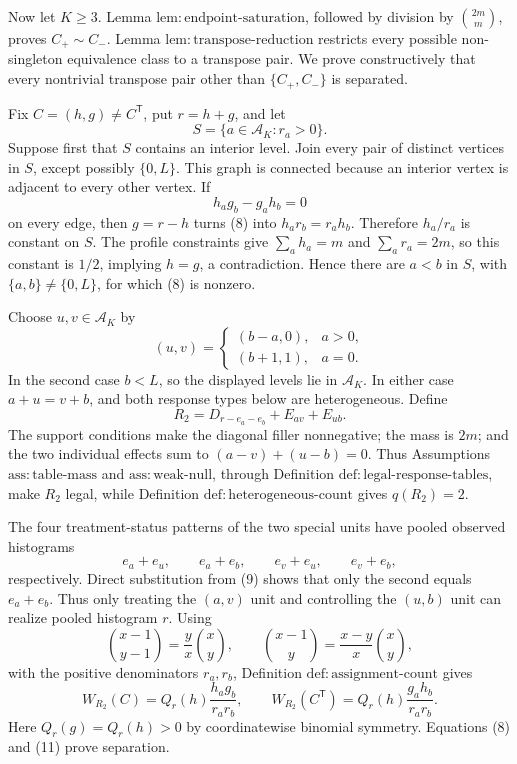 Now let \(K\geq3\). Lemma \(\mathrm{lem{:}endpoint\text{-}saturation}\), followed by division by \(\binom{2m}{m}\), proves \(C_+\sim C_-\). Lemma \(\mathrm{lem{:}transpose\text{-}reduction}\) restricts every possible non-singleton equivalence class to a transpose pair. We prove constructively that every nontrivial transpose pair other than \(\{C_+,C_-\}\) is separated.

Fix \(C=(h,g)\neq C^{\mathsf T}\), put \(r=h+g\), and let
\[
 S=\{a\in\mathcal A_K:r_a>0\}.
\]
Suppose first that \(S\) contains an interior level. Join every pair of distinct vertices in \(S\), except possibly \(\{0,L\}\). This graph is connected because an interior vertex is adjacent to every other vertex. If
\[
 h_ag_b-g_ah_b=0
 \tag{8}
\]
on every edge, then \(g=r-h\) turns (8) into \(h_ar_b=r_ah_b\). Therefore \(h_a/r_a\) is constant on \(S\). The profile constraints give \(\sum_a h_a=m\) and \(\sum_a r_a=2m\), so this constant is \(1/2\), implying \(h=g\), a contradiction. Hence there are \(a<b\) in \(S\), with \(\{a,b\}\neq\{0,L\}\), for which (8) is nonzero.

Choose \(u,v\in\mathcal A_K\) by
\[
 (u,v)=
 \begin{cases}
 (b-a,0),&a>0,\\
 (b+1,1),&a=0.
 \end{cases}
 \tag{9}
\]
In the second case \(b<L\), so the displayed levels lie in \(\mathcal A_K\). In either case \(a+u=v+b\), and both response types below are heterogeneous. Define
\[
 R_2=D_{r-e_a-e_b}+E_{av}+E_{ub}.
 \tag{10}
\]
The support conditions make the diagonal filler nonnegative; the mass is \(2m\); and the two individual effects sum to \((a-v)+(u-b)=0\). Thus Assumptions \(\mathrm{ass{:}table\text{-}mass}\) and \(\mathrm{ass{:}weak\text{-}null}\), through Definition \(\mathrm{def{:}legal\text{-}response\text{-}tables}\), make \(R_2\) legal, while Definition \(\mathrm{def{:}heterogeneous\text{-}count}\) gives \(q(R_2)=2\).

The four treatment-status patterns of the two special units have pooled observed histograms
\[
 e_a+e_u,\qquad e_a+e_b,\qquad e_v+e_u,\qquad e_v+e_b,
\]
respectively. Direct substitution from (9) shows that only the second equals \(e_a+e_b\). Thus only treating the \((a,v)\) unit and controlling the \((u,b)\) unit can realize pooled histogram \(r\). Using
\[
 \binom{x-1}{y-1}=\frac yx\binom xy,
 \qquad
 \binom{x-1}{y}=\frac{x-y}{x}\binom xy,
\]
with the positive denominators \(r_a,r_b\), Definition \(\mathrm{def{:}assignment\text{-}count}\) gives
\[
 W_{R_2}(C)=Q_r(h)\frac{h_ag_b}{r_ar_b},
 \qquad
 W_{R_2}(C^{\mathsf T})=Q_r(h)\frac{g_ah_b}{r_ar_b}.
 \tag{11}
\]
Here \(Q_r(g)=Q_r(h)>0\) by coordinatewise binomial symmetry. Equations (8) and (11) prove separation.

